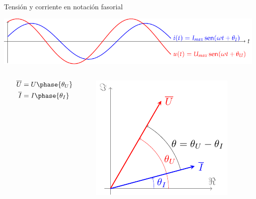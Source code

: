 \documentclass[aspectratio=169, usenames,svgnames,dvipsnames]{beamer}
\begin{document}
\begin{frame}[label={sec:org8672e71}]{Tensión y corriente en notación fasorial}
\begin{center}
\includegraphics[width=.9\linewidth]{../figs/ondasTensionCorriente.pdf}
\end{center}

\begin{columns}
\begin{column}{0.5\columnwidth}
\begin{align*}
  \overline{U} &= U\phase{\theta_U}\\
  \overline{I} &= I\phase{\theta_I}
\end{align*}
\end{column}

\begin{column}{0.5\columnwidth}
\begin{center}
\includegraphics[height=0.5\textheight]{../figs/fasorTensionCorriente.pdf}
\end{center}
\end{column}
\end{columns}
\end{frame}
\end{document}
